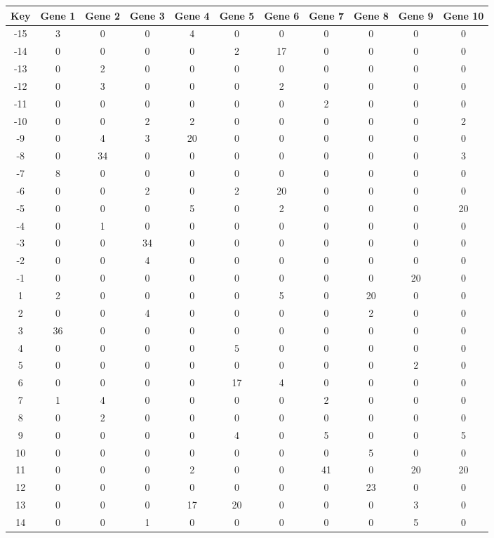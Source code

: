 \begin{tabular}{|c|c|c|c|c|c|c|c|c|c|c|}
\hline
Key & Gene 1 & Gene 2 & Gene 3 & Gene 4 & Gene 5 & Gene 6 & Gene 7 & Gene 8 & Gene 9 & Gene 10 \\
\hline
-15 & 3 & 0 & 0 & 4 & 0 & 0 & 0 & 0 & 0 & 0 \\
-14 & 0 & 0 & 0 & 0 & 2 & 17 & 0 & 0 & 0 & 0 \\
-13 & 0 & 2 & 0 & 0 & 0 & 0 & 0 & 0 & 0 & 0 \\
-12 & 0 & 3 & 0 & 0 & 0 & 2 & 0 & 0 & 0 & 0 \\
-11 & 0 & 0 & 0 & 0 & 0 & 0 & 2 & 0 & 0 & 0 \\
-10 & 0 & 0 & 2 & 2 & 0 & 0 & 0 & 0 & 0 & 2 \\
-9 & 0 & 4 & 3 & 20 & 0 & 0 & 0 & 0 & 0 & 0 \\
-8 & 0 & 34 & 0 & 0 & 0 & 0 & 0 & 0 & 0 & 3 \\
-7 & 8 & 0 & 0 & 0 & 0 & 0 & 0 & 0 & 0 & 0 \\
-6 & 0 & 0 & 2 & 0 & 2 & 20 & 0 & 0 & 0 & 0 \\
-5 & 0 & 0 & 0 & 5 & 0 & 2 & 0 & 0 & 0 & 20 \\
-4 & 0 & 1 & 0 & 0 & 0 & 0 & 0 & 0 & 0 & 0 \\
-3 & 0 & 0 & 34 & 0 & 0 & 0 & 0 & 0 & 0 & 0 \\
-2 & 0 & 0 & 4 & 0 & 0 & 0 & 0 & 0 & 0 & 0 \\
-1 & 0 & 0 & 0 & 0 & 0 & 0 & 0 & 0 & 20 & 0 \\
1 & 2 & 0 & 0 & 0 & 0 & 5 & 0 & 20 & 0 & 0 \\
2 & 0 & 0 & 4 & 0 & 0 & 0 & 0 & 2 & 0 & 0 \\
3 & 36 & 0 & 0 & 0 & 0 & 0 & 0 & 0 & 0 & 0 \\
4 & 0 & 0 & 0 & 0 & 5 & 0 & 0 & 0 & 0 & 0 \\
5 & 0 & 0 & 0 & 0 & 0 & 0 & 0 & 0 & 2 & 0 \\
6 & 0 & 0 & 0 & 0 & 17 & 4 & 0 & 0 & 0 & 0 \\
7 & 1 & 4 & 0 & 0 & 0 & 0 & 2 & 0 & 0 & 0 \\
8 & 0 & 2 & 0 & 0 & 0 & 0 & 0 & 0 & 0 & 0 \\
9 & 0 & 0 & 0 & 0 & 4 & 0 & 5 & 0 & 0 & 5 \\
10 & 0 & 0 & 0 & 0 & 0 & 0 & 0 & 5 & 0 & 0 \\
11 & 0 & 0 & 0 & 2 & 0 & 0 & 41 & 0 & 20 & 20 \\
12 & 0 & 0 & 0 & 0 & 0 & 0 & 0 & 23 & 0 & 0 \\
13 & 0 & 0 & 0 & 17 & 20 & 0 & 0 & 0 & 3 & 0 \\
14 & 0 & 0 & 1 & 0 & 0 & 0 & 0 & 0 & 5 & 0 \\
\hline
\end{tabular}